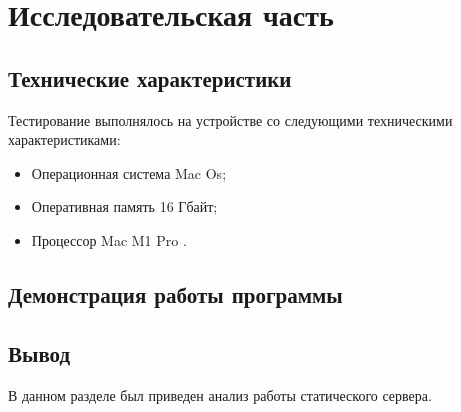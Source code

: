 \section{\large Исследовательская часть}

\subsection{Технические характеристики}

Тестирование выполнялось на устройстве со следующими техническими характеристиками:

\begin{itemize}
	\item Операционная система Mac Os\cite{linux};
	\item Оперативная память 16 Гбайт;
	\item Процессор Mac M1 Pro \cite{amd}.
\end{itemize}

\subsection{Демонстрация работы программы}



\subsection{Вывод}

В данном разделе был приведен анализ работы статического сервера.